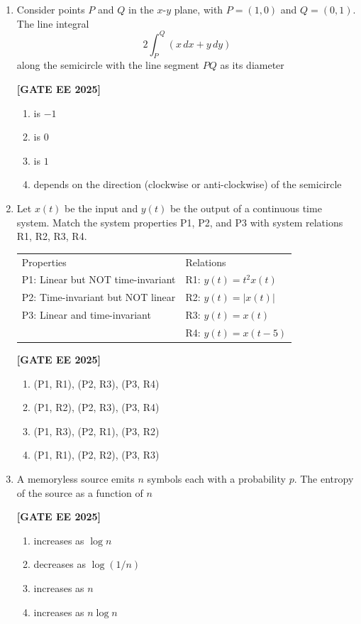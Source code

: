 \documentclass[12pt]{article}
\begin{document}
\begin{enumerate}[leftmargin=*, label=\textbf{Q.\arabic*:}]
\item Consider points $P$ and $Q$ in the $x$-$y$ plane, with $P = (1,0)$ and $Q = (0,1)$. The line integral
\[
2\int_P^Q (x\,dx + y\,dy)
\]
along the semicircle with the line segment $PQ$ as its diameter
 
\noindent \textbf{[GATE EE 2025]}
\begin{enumerate}
  \item is $-1$
  \item is $0$
  \item is $1$
  \item depends on the direction (clockwise or anti-clockwise) of the semicircle
\end{enumerate}

\item Let $x(t)$ be the input and $y(t)$ be the output of a continuous time system. Match the system properties P1, P2, and P3 with system relations R1, R2, R3, R4.
\begin{center}
  \begin{tabular}{ll}
    Properties & Relations \\
    P1: Linear but NOT time-invariant              & R1: $y(t)=t^2 x(t) $ \\
    P2: Time-invariant but NOT linear              & R2: $y(t)=|x(t)| $ \\
    P3: Linear and time-invariant                  & R3: $y(t)=x(t)$ \\
                                                  & R4: $y(t)=x(t-5)$
  \end{tabular}
\end{center}
 
\noindent \textbf{[GATE EE 2025]}
\begin{enumerate}
  \item (P1, R1), (P2, R3), (P3, R4)
  \item (P1, R2), (P2, R3), (P3, R4)
  \item (P1, R3), (P2, R1), (P3, R2)
  \item (P1, R1), (P2, R2), (P3, R3)
\end{enumerate}

\item A memoryless source emits $n$ symbols each with a probability $p$. The entropy of the source as a function of $n$
 
\noindent \textbf{[GATE EE 2025]}
\begin{enumerate}
  \item increases as $\log n$
  \item decreases as $\log(1/n)$
  \item increases as $n$
  \item increases as $n \log n$
\end{enumerate}


\end{enumerate}
\end{document}
